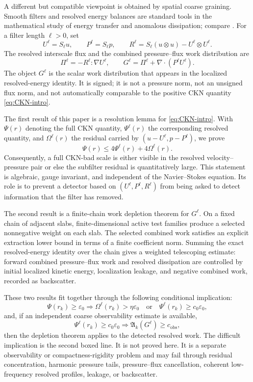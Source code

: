 \documentclass[10pt,a4paper]{amsart}
\numberwithin{equation}{section}
\begin{document}
A different but compatible viewpoint is obtained by spatial coarse graining.  Smooth filters and resolved energy balances are standard tools in the mathematical study of energy transfer and anomalous dissipation; compare \cite{ConstantinETiti1994,DuchonRobert2000,Eyink2005,EyinkAluie2009,DrivasNguyen2018}.  For a filter length \(\ell>0\), set
\[
U^\ell=S_\ell u,
\qquad
P^\ell=S_\ell p,
\qquad
R^\ell=S_\ell(u\otimes u)-U^\ell\otimes U^\ell.
\]
The resolved interscale flux and the combined pressure--flux work distribution are
\begin{equation}\label{eq:G-intro}
\Pi^\ell=-R^\ell:\nabla U^\ell,
\qquad
G^\ell=\Pi^\ell+\nabla\cdot(P^\ell U^\ell).
\end{equation}
The object \(G^\ell\) is the scalar work distribution that appears in the localized resolved-energy identity.  It is signed; it is not a pressure norm, not an unsigned flux norm, and not automatically comparable to the positive CKN quantity \eqref{eq:CKN-intro}.

The first result of this paper is a resolution lemma for \eqref{eq:CKN-intro}.  With \(\Psi(r)\) denoting the full CKN quantity, \(\Psi^\ell(r)\) the corresponding resolved quantity, and \(\Omega^\ell(r)\) the residual carried by \((u-U^\ell,p-P^\ell)\), we prove
\[
\Psi(r)\le 4\Psi^\ell(r)+4\Omega^\ell(r).
\]
Consequently, a full CKN-bad scale is either visible in the resolved velocity--pressure pair or else the subfilter residual is quantitatively large.  This statement is algebraic, gauge invariant, and independent of the Navier--Stokes equation.  Its role is to prevent a detector based on \((U^\ell,P^\ell,R^\ell)\) from being asked to detect information that the filter has removed.

The second result is a finite-chain work depletion theorem for \(G^\ell\).  On a fixed chain of adjacent slabs, finite-dimensional active test families produce a selected nonnegative weight on each slab.  The selected combined work satisfies an explicit extraction lower bound in terms of a finite coefficient norm.  Summing the exact resolved-energy identity over the chain gives a weighted telescoping estimate: forward combined pressure--flux work and resolved dissipation are controlled by initial localized kinetic energy, localization leakage, and negative combined work, recorded as backscatter.

These two results fit together through the following conditional implication:
\[
\boxed{
\Psi(r_k)\ge \varepsilon_0
\Longrightarrow
\Omega^\ell(r_k)>\eta\varepsilon_0
\quad\text{or}\quad
\Psi^\ell(r_k)\ge c_0\varepsilon_0,
}
\]
and, if an independent coarse observability estimate is available,
\[
\boxed{
\Psi^\ell(r_k)\ge c_0\varepsilon_0
\Longrightarrow
\mathfrak A_k(G^\ell)\ge c_{\mathrm{obs}},
}
\]
then the depletion theorem applies to the detected resolved work.  The difficult implication is the second boxed line.  It is not proved here.  It is a separate observability or compactness-rigidity problem and may fail through residual concentration, harmonic pressure tails, pressure--flux cancellation, coherent low-frequency resolved profiles, leakage, or backscatter.
\end{document}
